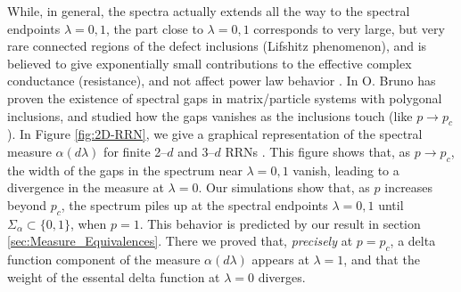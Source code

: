 \documentclass[english,12pt,jmp,graphicx]{revtex4-1}
\begin{document}
While, in general, the spectra actually extends all the way
to the spectral endpoints $\lambda=0,1$, the part close to $\lambda=0,1$
corresponds to very large, but very rare connected regions of the
defect inclusions (Lifshitz phenomenon), and is
believed to give exponentially small contributions to the effective
complex conductance (resistance), and not
affect power law behavior \cite{Golden:PRL-3935}. In
\cite{Bruno:PRSLA-353} O. Bruno has proven the existence of spectral
gaps in matrix/particle systems with polygonal inclusions, and studied
how the gaps vanishes as the inclusions touch (like $p\to p_c$). In
Figure \ref{fig:2D-RRN}, we give a graphical representation of the
spectral measure $\alpha(d\lambda)$ for finite 2--$d$ and 3--$d$ RRNs
\cite{Golden:JoB:337}. This figure shows that, as $p\to p_c$, the width
of the gaps in the spectrum near $\lambda=0,1$ vanish, leading to a
divergence in the measure at $\lambda=0$. Our simulations show that, as $p$
increases beyond $p_c$, the spectrum piles up at the spectral
endpoints $\lambda=0,1$ until $\Sigma_\alpha\subset\{0,1\}$, when $p=1$. This behavior is
predicted by our result in section
\ref{sec:Measure_Equivalences}. There we proved that, \emph{precisely}
at $p=p_c$, a delta function component of the measure $\alpha(d\lambda)$ appears 
at $\lambda=1$, and that the weight of the essental delta function at $\lambda=0$
diverges.
\end{document}
